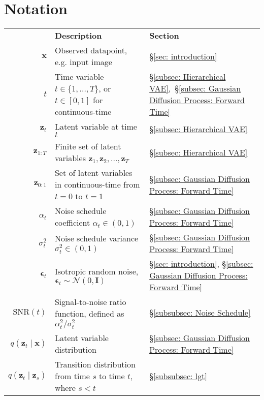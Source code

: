 \section*{Notation}
\begin{table}[!h]
    \centering
    \begin{tabular}{rll}
        &\textbf{Description} & \textbf{Section} \\[8pt]
        $\mathbf{x}$ & Observed datapoint, e.g. input image & \S\ref{sec: introduction} \\[5pt]
        $t$ & Time variable $t \in \{1,\dots,T\}$, or $t \in [0,1]$ for continuous-time & \S\ref{subsec: Hierarchical VAE},~\S\ref{subsec: Gaussian Diffusion Process: Forward Time} \\[5pt]
        $\mathbf{z}_t$ & Latent variable at time $t$
        & \S\ref{subsec: Hierarchical VAE} \\[5pt]
        $\mathbf{z}_{1:T}$ & Finite set of latent variables $\mathbf{z}_1, \mathbf{z}_2,\dots,\mathbf{z}_T$ & \S\ref{subsec: Hierarchical VAE} \\[5pt]
        $\mathbf{z}_{0:1}$ & Set of latent variables in continuous-time from $t{=}0$ to $t{=}1$ & \S\ref{subsec: Gaussian Diffusion Process: Forward Time} \\[5pt]
        $\alpha_t$ & Noise schedule coefficient $\alpha_t \in (0, 1)$ & \S\ref{subsec: Gaussian Diffusion Process: Forward Time} \\[5pt]
        $\sigma^2_t$ & Noise schedule variance $\sigma^2_t \in (0, 1)$ & \S\ref{subsec: Gaussian Diffusion Process: Forward Time} \\[5pt]
        $\boldsymbol{\epsilon}_t$ & Isotropic random noise, $\boldsymbol{\epsilon}_t \sim \mathcal{N}(0,\mathbf{I})$ & \S\ref{sec: introduction}, \S\ref{subsec: Gaussian Diffusion Process: Forward Time}\\[5pt]
        $\mathrm{SNR}(t)$ & Signal-to-noise ratio function, defined as $\alpha^2_t / \sigma^2_t$ & \S\ref{subsubsec: Noise Schedule}\\[5pt]
        $q(\mathbf{z}_t \mid \mathbf{x})$ & Latent variable distribution & \S\ref{subsec: Gaussian Diffusion Process: Forward Time} \\[5pt]
        $q(\mathbf{z}_t \mid \mathbf{z}_s)$ & Transition distribution from time $s$ to time $t$, where $s < t$ & \S\ref{subsubsec: lgt} \\[5pt]

\end{tabular}
\end{table}

